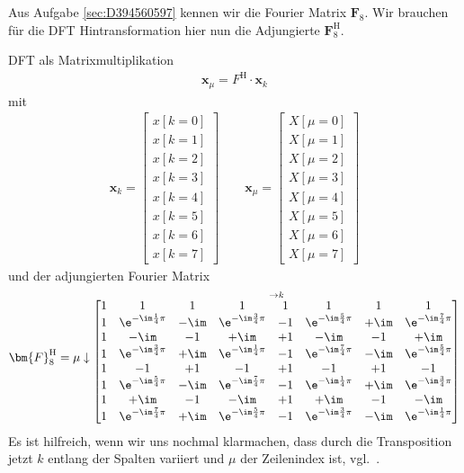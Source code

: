 \begin{Werkzeug}
Aus Aufgabe \ref{sec:D394560597} kennen wir die Fourier Matrix $\bm{F}_8$.
Wir brauchen für die DFT Hintransformation hier nun die Adjungierte $\bm{F}^\mathrm{H}_8$.
\end{Werkzeug}
\begin{Ansatz}
DFT als Matrixmultiplikation
\begin{align}
\bm{x}_\mu = F^\mathrm{H} \cdot \bm{x}_k
\end{align}
mit
\begin{align}
%
\bm{x}_k =
\begin{bmatrix}
x[k=0]\\x[k=1]\\x[k=2]\\x[k=3]\\x[k=4]\\x[k=5]\\x[k=6]\\x[k=7]
\end{bmatrix}
%
\qquad
%
\bm{x}_\mu =
\begin{bmatrix}
X[\mu=0]\\X[\mu=1]\\X[\mu=2]\\X[\mu=3]\\X[\mu=4]\\X[\mu=5]\\X[\mu=6]\\X[\mu=7]
\end{bmatrix}
%
\end{align}
und der adjungierten Fourier Matrix
\begin{align}
\bm{F}^\mathrm{H}_8 =
\mu \downarrow
\substack{\rightarrow k\\
\begin{bmatrix}
1 & 1 & 1 & 1 & 1 & 1 & 1 & 1\\
1 & \e^{-\im\frac{1}{4}\pi} & -\im & \e^{-\im\frac{3}{4}\pi} & -1 & \e^{-\im\frac{5}{4}\pi} & +\im & \e^{-\im\frac{7}{4}\pi}\\
1 & -\im & -1 & +\im & +1 & -\im & -1 & +\im\\
1 & \e^{-\im\frac{3}{4}\pi} & +\im & \e^{-\im\frac{1}{4}\pi} & -1 & \e^{-\im\frac{7}{4}\pi} & -\im & \e^{-\im\frac{5}{4}\pi}\\
1 & -1 & +1 & -1 & +1 & -1 & +1 & -1\\
1 & \e^{-\im\frac{5}{4}\pi} & -\im & \e^{-\im\frac{7}{4}\pi} & -1 & \e^{-\im\frac{1}{4}\pi} & +\im & \e^{-\im\frac{3}{4}\pi}\\
1 & +\im & -1 & -\im & +1 & +\im & -1 & -\im\\
1 & \e^{-\im\frac{7}{4}\pi} & +\im & \e^{-\im\frac{5}{4}\pi} & -1 & \e^{-\im\frac{3}{4}\pi} & -\im & \e^{-\im\frac{1}{4}\pi}\\
\end{bmatrix}
}
%
\end{align}
Es ist hilfreich, wenn wir uns nochmal klarmachen, dass durch die Transposition
jetzt $k$ entlang der Spalten variiert und $\mu$ der Zeilenindex ist,
vgl.~.
\end{Ansatz}
%

